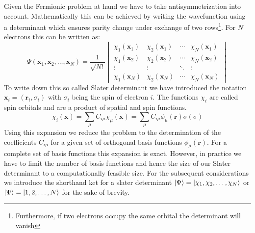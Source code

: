 Given the Fermionic problem at hand we have to take antisymmetrization into account. Mathematically this can be achieved by writing the wavefunction using a determinant which ensures parity change under exchange of two rows\footnote{Furthermore, if two electrons occupy the same orbital the determinant will vanish}. For $N$ electrons this can be written as:
\begin{equation}
    \Psi(\mathbf{x}_1, \mathbf{x}_2, \ldots, \mathbf{x}_N) = \frac{1}{\sqrt{N!}}
    \begin{vmatrix}
    \chi_1(\mathbf{x}_1) & \chi_2(\mathbf{x}_1) & \cdots & \chi_N(\mathbf{x}_1) \\
    \chi_1(\mathbf{x}_2) & \chi_2(\mathbf{x}_2) & \cdots & \chi_N(\mathbf{x}_2) \\
    \vdots & \vdots & \ddots & \vdots \\
    \chi_1(\mathbf{x}_N) & \chi_2(\mathbf{x}_N) & \cdots & \chi_N(\mathbf{x}_N)
    \end{vmatrix}
\end{equation}
To write down this so called Slater determinant we have introduced the notation $\mathbf{x}_i = (\mathbf{r}_i, \sigma_i)$ with $\sigma_i$ being the spin of electron $i$. The functions $\chi_i$ are called spin orbitals and are a product of spatial and spin functions. 
\begin{equation}
    \chi_i(\mathbf{x}) = \sum_{\mu} C_{i\mu} \chi_\mu(\mathbf{x}) = \sum_{\mu} C_{i\mu} \phi_\mu(\mathbf{r}) \sigma(\sigma)
\end{equation}
Using this expansion we reduce the problem to the determination of the coefficients $C_{i\mu}$ for a given set of orthogonal basis functions $\phi_\mu(\mathbf{r})$. For a complete set of basis functions this expansion is exact. However, in practice we have to limit the number of basis functions and hence the size of our Slater determinant to a computationally feasible size. For the subsequent considerations we introduce the shorthand ket for a slater determinant $\ket{\Psi} = \ket{\chi_1, \chi_2, \ldots, \chi_N}$ or $\ket{\Psi} = \ket{1, 2, \ldots, N}$ for the sake of brevity.




